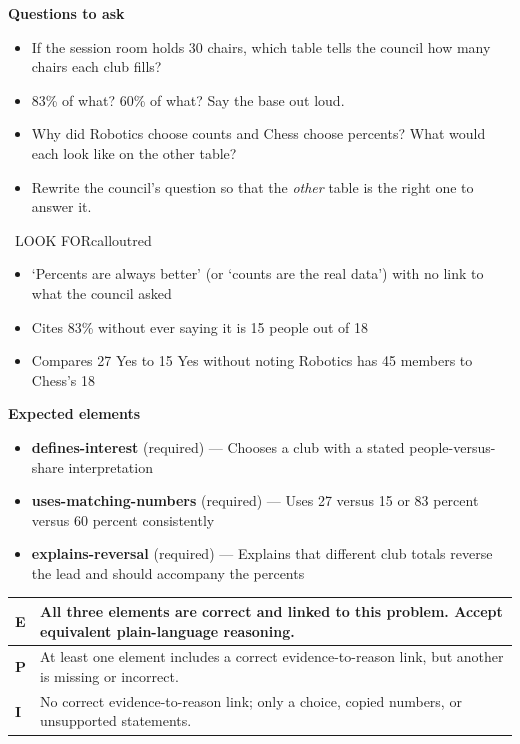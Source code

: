 \documentclass[11pt]{article}
\begin{document}
\textbf{Questions to ask}
\begin{itemize}[leftmargin=1.5em,itemsep=2pt,topsep=2pt]
  \item If the session room holds 30 chairs, which table tells the council how many chairs each club fills?
  \item 83\% of what? 60\% of what? Say the base out loud.
  \item Why did Robotics choose counts and Chess choose percents? What would each look like on the other table?
  \item Rewrite the council's question so that the \emph{other} table is the right one to answer it.
\end{itemize}

\begin{callout}{\IconWarn\ LOOK FOR}{calloutred}
\begin{itemize}[leftmargin=1.5em,itemsep=2pt,topsep=2pt]
  \item `Percents are always better' (or `counts are the real data') with no link to what the council asked
  \item Cites 83\% without ever saying it is 15 people out of 18
  \item Compares 27 Yes to 15 Yes without noting Robotics has 45 members to Chess's 18
\end{itemize}
\end{callout}


\textbf{Expected elements}
\begin{itemize}[leftmargin=1.5em,itemsep=2pt,topsep=2pt]
  \item \textbf{defines-interest} (required) --- Chooses a club with a stated people-versus-share interpretation
  \item \textbf{uses-matching-numbers} (required) --- Uses 27 versus 15 or 83 percent versus 60 percent consistently
  \item \textbf{explains-reversal} (required) --- Explains that different club totals reverse the lead and should accompany the percents
\end{itemize}

{\small\renewcommand{\arraystretch}{1.25}
\noindent\begin{tabular}{|p{0.5in}|p{5.9in}|}
\hline
\textbf{E} & All three elements are correct and linked to this problem. Accept equivalent plain-language reasoning. \\ \hline
\textbf{P} & At least one element includes a correct evidence-to-reason link, but another is missing or incorrect. \\ \hline
\textbf{I} & No correct evidence-to-reason link; only a choice, copied numbers, or unsupported statements. \\ \hline
\end{tabular}}
\end{document}
